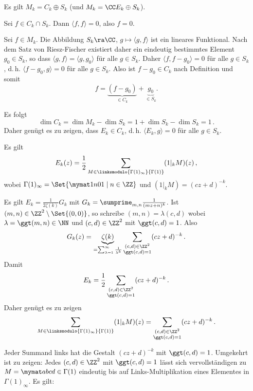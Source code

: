 \begin{bewe}
\begin{lemm}
	Es gilt $M_k = C_k \oplus S_k$ (und $M_k = \CC E_k \oplus S_k$).
\end{lemm}

\begin{bewe}
	Sei $f \in C_k \cap S_k$. Dann $\langle f, f \rangle = 0$, also $f = 0$.
	
	Sei $f \in M_k$.
	Die Abbildung $S_k \ra \CC$, $g \mapsto \langle g,f \rangle$ ist ein lineares Funktional.
	Nach dem Satz von Riesz-Fischer existiert daher ein eindeutig bestimmtes Element $g_0 \in S_k$, so dass $\langle g,f \rangle = \langle g, g_0 \rangle$ für alle $g \in S_k$.
	Daher $\langle f, f-g_0 \rangle = 0$ für alle $g\in S_k$, d.\,h. $\langle f-g_0, g \rangle = 0$ für alle $g \in S_k$.
	Also ist $f-g_0 \in C_k$ nach Definition und somit
	\[
		f = \underbrace{(f-g_0)}_{\in C_k} + \underbrace{g_0}_{\in S_k} .
	\]
\end{bewe}

Es folgt
\[
	\dim C_k = \dim M_k - \dim S_k = 1 + \dim S_k - \dim S_k = 1\,.
\]
Daher genügt es zu zeigen, dass $E_k \in C_k$, d.\,h. $\langle E_k, g \rangle = 0$ für alle $g \in S_k$.

\begin{lemm}
	Es gilt
	\[
		E_k(z) = \frac{1}{2} \sum_{M \in \linksmodulo{\Gamma(1)_\infty}{\Gamma(1)}} (1|_k M)(z)\,,
	\]
	wobei $\Gamma(1)_\infty = \Set{\mymat 1n01 \mid n \in \ZZ}$ und $(1|_k M) = (cz+d)^{-k}$.
\end{lemm}

\begin{bewe}
	Es gilt $E_k = \frac{1}{2\zeta(k)} G_k$ mit $G_k = \sumprime_{m,n} \frac{1}{(mz+n)^k}$.
	Ist $(m,n) \in \ZZ^2\setminus\Set{(0,0)}$, so schreibe $(m,n) = \lambda (c,d)$ wobei $\lambda = \ggt(m,n) \in \NN$ und $(c,d) \in \ZZ^2$ mit $\ggt(c,d) = 1$.
	Also
	\[
		G_k(z)
		= \underbrace{\zeta(k)}_{= \sum_{\lambda=1}^\infty \frac{1}{\lambda^k}} \sum_{\substack{(c,d) \in \ZZ^2 \\ \ggt(c,d) = 1}} (cz+d)^{-k}
		\,.
	\]
	Damit
	\[
		E_k = \frac{1}{2} \sum_{\substack{(c,d) \in \ZZ^2 \\ \ggt(c,d) = 1}} (cz+d)^{-k}
		\,.
	\]
	Daher genügt es zu zeigen
	\[
		\sum_{M \in \linksmodulo{\Gamma(1)_\infty}{\Gamma(1)}} (1|_k M)(z)
		= \sum_{\substack{(c,d) \in \ZZ^2 \\ \ggt(c,d) = 1}} (cz+d)^{-k}
		\,.
	\]
	
	Jeder Summand links hat die Gestalt $(cz+d)^{-k}$ mit $\ggt(c,d) = 1$.
	Umgekehrt ist zu zeigen:
	Jedes $(c,d) \in \ZZ^2$ mit $\ggt(c,d) = 1$ lässt sich vervollständigen zu $M = \mymat abcd \in \Gamma(1)$ eindeutig bis auf Links-Multiplikation eines Elementes in $\Gamma(1)_\infty$.
	Es gilt:
	

\end{bewe}
\end{bewe}
